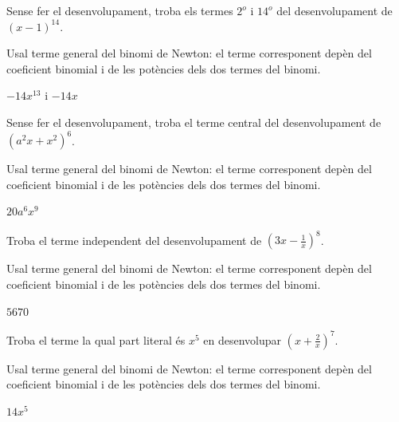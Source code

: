 \begin{exercici}
Sense fer el desenvolupament, troba els termes $2^{o}$ i $14^{o}$ del
desenvolupament de $(x-1)^{14}$.
\end{exercici}
\begin{indicacio}
Usal terme general del binomi de Newton: el terme corresponent depèn del coeficient binomial i de les potències dels dos termes del binomi.
\end{indicacio}

\begin{solucio}
$-14x^{13}$ i $-14x$
\end{solucio}

\begin{exercici}
Sense fer el desenvolupament, troba el terme central del desenvolupament
de $(a^{2}x+x^{2})^{6}$.
\end{exercici}
\begin{indicacio}
Usal terme general del binomi de Newton: el terme corresponent depèn del coeficient binomial i de les potències dels dos termes del binomi.
\end{indicacio}

\begin{solucio}
$20a^{6}x^{9}$
\end{solucio}

\begin{exercici}
Troba el terme independent del desenvolupament de $\left( 3x-\frac{1
}{x}\right) ^{8}$.
\end{exercici}
\begin{indicacio}
Usal terme general del binomi de Newton: el terme corresponent depèn del coeficient binomial i de les potències dels dos termes del binomi.
\end{indicacio}

\begin{solucio}
$5670$
\end{solucio}

\begin{exercici}
Troba el terme la qual part literal és $x^{5}$ en desenvolupar $
\left( x+\frac{2}{x}\right) ^{7}$.
\end{exercici}
\begin{indicacio}
Usal terme general del binomi de Newton: el terme corresponent depèn del coeficient binomial i de les potències dels dos termes del binomi.
\end{indicacio}

\begin{solucio}
$14x^{5}$
\end{solucio}

